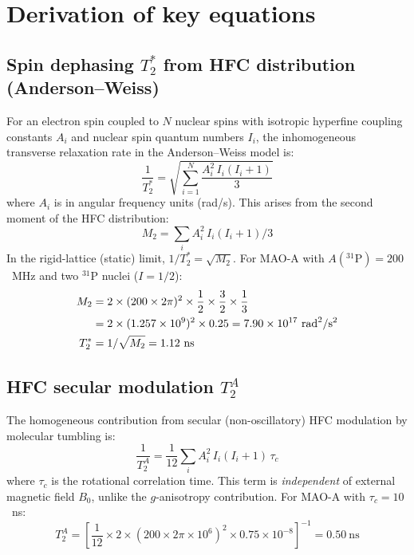 


\newpage

\section{Derivation of key equations}

\subsection{Spin dephasing $T_2^*$ from HFC distribution (Anderson--Weiss)}

For an electron spin coupled to $N$ nuclear spins with isotropic hyperfine coupling constants $A_i$ and nuclear spin quantum numbers $I_i$, the inhomogeneous transverse relaxation rate in the Anderson--Weiss model is\cite{Anderson1954}:
\begin{equation}
\frac{1}{T_2^*} = \sqrt{\sum_{i=1}^{N} \frac{A_i^2\, I_i(I_i+1)}{3}}
\label{eq:T2star}
\end{equation}
where $A_i$ is in angular frequency units (rad/s). This arises from the second moment of the HFC distribution:
\begin{equation}
M_2 = \sum_i A_i^2\, I_i(I_i+1)/3
\end{equation}
In the rigid-lattice (static) limit, $1/T_2^* = \sqrt{M_2}$. For MAO-A with $A(^{31}\mathrm{P}) = 200$~MHz and two $^{31}$P nuclei ($I = 1/2$):
\begin{align}
M_2 &= 2 \times (200 \times 2\pi)^2 \times \frac{1}{2}\times\frac{3}{2}\times\frac{1}{3} \notag\\
    &= 2 \times (1.257 \times 10^9)^2 \times 0.25 = 7.90 \times 10^{17}~\mathrm{rad}^2/\mathrm{s}^2 \notag\\
T_2^* &= 1/\sqrt{M_2} = 1.12~\mathrm{ns}
\end{align}

\subsection{HFC secular modulation $T_2^A$}

The homogeneous contribution from secular (non-oscillatory) HFC modulation by molecular tumbling is\cite{Abragam1961}:
\begin{equation}
\frac{1}{T_2^A} = \frac{1}{12}\sum_{i} A_i^2\, I_i(I_i + 1)\,\tau_c
\label{eq:T2A}
\end{equation}
where $\tau_c$ is the rotational correlation time. This term is \emph{independent} of external magnetic field $B_0$, unlike the $g$-anisotropy contribution. For MAO-A with $\tau_c = 10$~ns:
\begin{equation}
T_2^A = \left[\frac{1}{12} \times 2 \times (200 \times 2\pi \times 10^6)^2 \times 0.75 \times 10^{-8}\right]^{-1} = 0.50~\mathrm{ns}
\end{equation}

